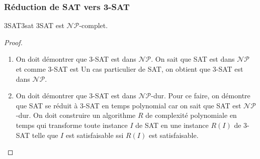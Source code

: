 \subsubsection{Réduction de SAT vers 3-SAT}
\label{sub:reduction_de_sat_vers_3_sat}
\begin{theorem}{3SAT}{3sat}
    3SAT est $\mathcal{NP}$-complet.
\end{theorem}
\begin{proof}
    \begin{enumerate}[label=\protect\circled{\arabic*}]
        \item On doit démontrer que 3-SAT est dans $\mathcal{NP}$. On sait que SAT est dans $\mathcal{NP}$ et comme 3-SAT est Un
        cas particulier de SAT, on obtient que 3-SAT est dans $\mathcal{NP}$.
        \item On doit démontrer que 3-SAT est dans $\mathcal{NP}$-dur. Pour ce faire, on démontre que SAT se réduit à 3-SAT en 
        temps polynomial car on sait que SAT est $\mathcal{NP}$-dur. On doit construire un algorithme $R$ de complexité polynomiale
        en temps qui transforme toute instance $I$ de SAT en une instance $R(I)$ de 3-SAT telle que $I$ est satisfaisable ssi
        $R(I)$ est satisfaisable.
        \begin{example}
            

\end{example}
\end{enumerate}
\end{proof}
